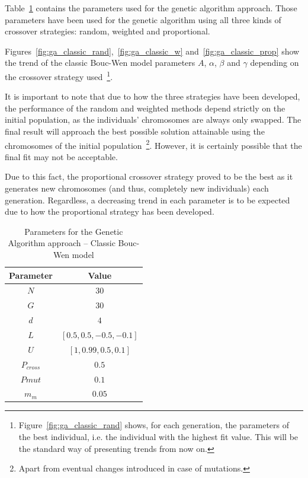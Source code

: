 Table~\ref{tab:ga_classic_params} contains the parameters used
for the genetic algorithm approach. Those parameters have been used for
the genetic algorithm using all three kinds of crossover strategies:
random, weighted and proportional.

Figures~\ref{fig:ga_classic_rand},~\ref{fig:ga_classic_w}
and~\ref{fig:ga_classic_prop} show the trend of the classic Bouc-Wen model
parameters $A$, $\alpha$, $\beta$ and $\gamma$ depending on the
crossover strategy used~\footnote{Figure~\ref{fig:ga_classic_rand} shows, for each generation,
the parameters of the best individual, i.e. the individual with the highest fit value.
This will be the standard way of presenting trends from now on.}.

It is important to note that due to how the three strategies have been developed,
the performance of the random and weighted methods depend strictly on
the initial population, as the individuals' chromosomes are always only swapped.
The final result will approach the best possible solution attainable
using the chromosomes of the initial population~\footnote{
	Apart from eventual changes introduced in case of mutations.}. 
However, it is certainly possible that the final fit may not be acceptable.

Due to this fact, the proportional crossover strategy proved to be the best
as it generates new chromosomes (and thus, completely new individuals)
each generation. Regardless, a decreasing trend in each parameter is to be expected
due to how the proportional strategy has been developed.

\begin{table}[]
	\centering
	\begin{tabular}{c c}
		\toprule
		\textbf{Parameter} & \textbf{Value} \\ \toprule
		$N$			& $30$ \\
		$G$			& $30$ \\
		$d$			& $4$  \\
		$L$			& $\left[0.5, 0.5, -0.5, -0.1\right]$ \\
		$U$			& $\left[1, 0.99, 0.5, 0.1\right]$ \\ 
		$P_{cross}$	& $0.5$ \\
		$P{mut}$	& $0.1$ \\
		$m_m$		& $0.05$ \\	\bottomrule
	\end{tabular}
	\caption{Parameters for the Genetic Algorithm approach -- Classic Bouc-Wen model}
	\label{tab:ga_classic_params}
\end{table}


